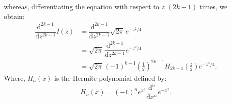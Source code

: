 \documentclass[a4paper,12pt]{article}
\newcommand{\dd}{\mathrm{d}}
\newcommand{\diff}[2]{\dfrac{\dd #1}{\dd #2}}
\begin{document}
  whereas, differentiating the equation with respect to $z$ $(2k-1)$ times, we obtain:
  \begin{align*}
    \diff{^{2k-1}}{z^{2k-1}} I(z) &= \diff{^{2k-1}}{z^{2k-1}} \sqrt{2\pi} \, e^{-z^2/4} \\
    &= \sqrt{2\pi} \, \diff{^{2k-1}}{z^{2k-1}} e^{-z^2/4} \\
    &= \sqrt{2\pi} \, (-1)^{k-1} \left(\frac{1}{2}\right)^{2k-1} H_{2k-1}\left(\frac{z}{2}\right) e^{-z^2/4}. 
  \end{align*}
  Where, $H_n(x)$ is the Hermite polynomial defined by:
  \begin{align}
    H_n(x) = (-1)^n e^{x^2} \diff{^n}{x^n} e^{-x^2}.
  \end{align}

\clearpage

\nocite{*} 
 
 
\end{document}
